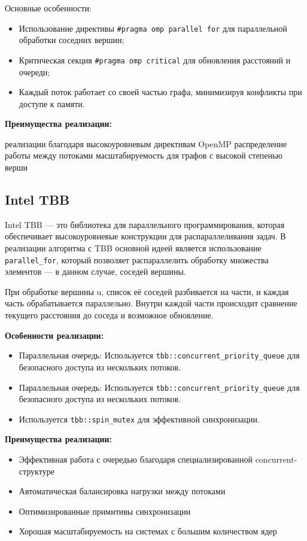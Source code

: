 \documentclass[12pt]{article}
\begin{document}
Основные особенности:


\begin{itemize}
\item Использование директивы \texttt{\#pragma omp parallel for} для параллельной обработки соседних вершин;
\item Критическая секция \texttt{\#pragma omp critical} для обновления расстояний и очереди;
\item  Каждый поток работает со своей частью графа, минимизируя конфликты при доступе к памяти.
\end{itemize}

\textbf{Преимущества реализации:}
\begin{itemize}
 реализации благодаря высокоуровневым директивам OpenMP
 распределение работы между потоками
 масштабируемость для графов с высокой степенью верши
\end{itemize}

\subsection{Intel TBB}

\hspace*{1.25em}Intel TBB — это библиотека для параллельного программирования, которая обеспечивает высокоуровневые конструкции для распараллеливания задач. В реализации алгоритма с TBB основной идеей является использование \texttt{parallel\_for}, который позволяет распараллелить обработку множества элементов — в данном случае, соседей вершины.

При обработке вершины u, список её соседей разбивается на части, и каждая часть обрабатывается параллельно. Внутри каждой части происходит сравнение текущего расстояния до соседа и возможное обновление. 

\textbf{Особенности реализации:}

\begin{itemize}
\item Параллельная очередь: Используется \texttt{tbb::concurrent\_priority\_queue} для безопасного доступа из нескольких потоков.
\item Параллельная очередь: Используется \texttt{tbb::concurrent\_priority\_queue} для безопасного доступа из нескольких потоков.
\item Используется \texttt{tbb::spin\_mutex} для эффективной синхронизации.
\end{itemize}

\textbf{Преимущества реализации:}
\begin{itemize}
\item Эффективная работа с очередью благодаря специализированной concurrent-структуре
\item Автоматическая балансировка нагрузки между потоками
\item Оптимизированные примитивы синхронизации
\item Хорошая масштабируемость на системах с большим количеством ядер
\end{itemize}
\end{document}
